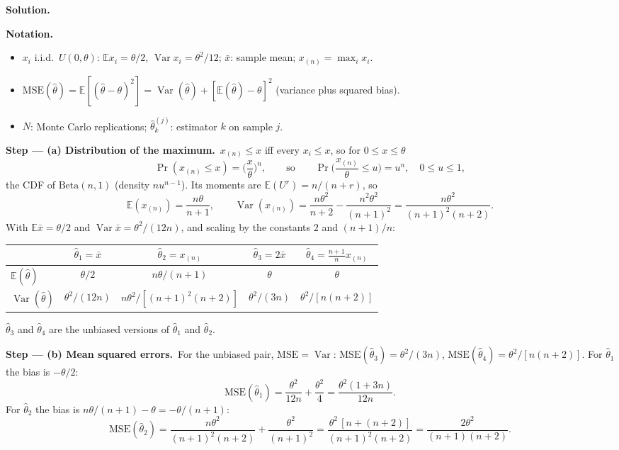 \documentclass[11pt,a4paper]{article}
\numberwithin{equation}{questao}   %
\newenvironment{notacao}{\par\smallskip\noindent\textbf{Notation.}\begin{itemize}[leftmargin=1.4em,topsep=1pt,itemsep=0pt]\small}{\end{itemize}}
\newcommand{\passo}[2]{\par\smallskip\noindent\textbf{Step --- #1.}~#2}
\newcommand{\solhead}{\par\medskip\noindent{\color{blue!55!black}\rule{\linewidth}{0.3pt}}\par\noindent\textbf{Solution.}}
\newcommand{\E}{\mathbb{E}}
\newcommand{\Var}{\operatorname{Var}}
\begin{document}
\begin{sol}
\solhead
\begin{notacao}
\item $x_i$ i.i.d.\ $U(0,\theta)$: $\E x_i=\theta/2$, $\Var x_i=\theta^2/12$; $\bar x$: sample mean;
  $x_{(n)}=\max_ix_i$.
\item $\mathrm{MSE}(\hat\theta)=\E[(\hat\theta-\theta)^2]=\Var(\hat\theta)+[\E(\hat\theta)-\theta]^2$ (variance
  plus squared bias).
\item $N$: Monte Carlo replications; $\hat\theta_k^{(j)}$: estimator $k$ on sample $j$.
\end{notacao}

\passo{(a) Distribution of the maximum}{$x_{(n)}\le x$ iff every $x_i\le x$, so for $0\le x\le\theta$}
\begin{equation}\label{q20:cdf}
\Pr(x_{(n)}\le x)=\Big(\frac x\theta\Big)^n,\qquad\text{so}\qquad
\Pr\Big(\frac{x_{(n)}}\theta\le u\Big)=u^n,\quad 0\le u\le1,
\end{equation}
the CDF of $\mathrm{Beta}(n,1)$ (density $nu^{n-1}$). Its moments are $\E(U^r)=n/(n+r)$, so
\begin{equation}\label{q20:mom}
\E(x_{(n)})=\frac{n\theta}{n+1},\qquad
\Var(x_{(n)})=\frac{n\theta^2}{n+2}-\frac{n^2\theta^2}{(n+1)^2}=\frac{n\theta^2}{(n+1)^2(n+2)} .
\end{equation}
With $\E\bar x=\theta/2$ and $\Var\bar x=\theta^2/(12n)$, and scaling by the constants $2$ and $(n+1)/n$:
\begin{center}\small
\begin{tabular}{lcccc}
\toprule
& $\hat\theta_1=\bar x$ & $\hat\theta_2=x_{(n)}$ & $\hat\theta_3=2\bar x$ & $\hat\theta_4=\frac{n+1}nx_{(n)}$\\
\midrule
$\E(\hat\theta)$ & $\theta/2$ & $n\theta/(n+1)$ & $\theta$ & $\theta$\\
$\Var(\hat\theta)$ & $\theta^2/(12n)$ & $n\theta^2/[(n+1)^2(n+2)]$ & $\theta^2/(3n)$ & $\theta^2/[n(n+2)]$\\
\bottomrule
\end{tabular}
\end{center}
$\hat\theta_3$ and $\hat\theta_4$ are the unbiased versions of $\hat\theta_1$ and $\hat\theta_2$.

\passo{(b) Mean squared errors}{For the unbiased pair, $\mathrm{MSE}=\Var$:
$\mathrm{MSE}(\hat\theta_3)=\theta^2/(3n)$, $\mathrm{MSE}(\hat\theta_4)=\theta^2/[n(n+2)]$. For $\hat\theta_1$
the bias is $-\theta/2$:}
\begin{equation}\label{q20:m1}
\mathrm{MSE}(\hat\theta_1)=\frac{\theta^2}{12n}+\frac{\theta^2}{4}=\frac{\theta^2(1+3n)}{12n}.
\end{equation}
For $\hat\theta_2$ the bias is $n\theta/(n+1)-\theta=-\theta/(n+1)$:
\begin{equation}\label{q20:m2}
\mathrm{MSE}(\hat\theta_2)=\frac{n\theta^2}{(n+1)^2(n+2)}+\frac{\theta^2}{(n+1)^2}
=\frac{\theta^2\,[n+(n+2)]}{(n+1)^2(n+2)}=\frac{2\theta^2}{(n+1)(n+2)} .
\end{equation}


\end{sol}
\end{document}
